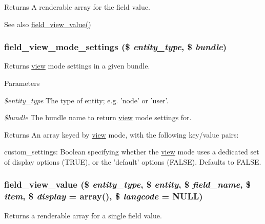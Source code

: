 \begin{DoxyReturn}{Returns}
A renderable array for the field value.
\end{DoxyReturn}
\begin{DoxySeeAlso}{See also}
\hyperlink{group__field_gab716b21eb481e4f9d9f5f2af71093d81}{field\_\-view\_\-value()} 
\end{DoxySeeAlso}
\hypertarget{group__field_ga43d37035f8764e021f18821d46a92341}{
\subsubsection[{field\_\-view\_\-mode\_\-settings}]{\setlength{\rightskip}{0pt plus 5cm}field\_\-view\_\-mode\_\-settings (\$ {\em entity\_\-type}, \/  \$ {\em bundle})}}
\label{group__field_ga43d37035f8764e021f18821d46a92341}
Returns \hyperlink{classview}{view} mode settings in a given bundle.


\begin{DoxyParams}{Parameters}
\item[{\em \$entity\_\-type}]The type of entity; e.g. 'node' or 'user'. \item[{\em \$bundle}]The bundle name to return \hyperlink{classview}{view} mode settings for.\end{DoxyParams}
\begin{DoxyReturn}{Returns}
An array keyed by \hyperlink{classview}{view} mode, with the following key/value pairs:
\begin{DoxyItemize}
\item custom\_\-settings: Boolean specifying whether the \hyperlink{classview}{view} mode uses a dedicated set of display options (TRUE), or the 'default' options (FALSE). Defaults to FALSE. 
\end{DoxyItemize}
\end{DoxyReturn}
\hypertarget{group__field_gab716b21eb481e4f9d9f5f2af71093d81}{
\subsubsection[{field\_\-view\_\-value}]{\setlength{\rightskip}{0pt plus 5cm}field\_\-view\_\-value (\$ {\em entity\_\-type}, \/  \$ {\em entity}, \/  \$ {\em field\_\-name}, \/  \$ {\em item}, \/  \$ {\em display} = {\ttfamily array()}, \/  \$ {\em langcode} = {\ttfamily NULL})}}
\label{group__field_gab716b21eb481e4f9d9f5f2af71093d81}
Returns a renderable array for a single field value.


